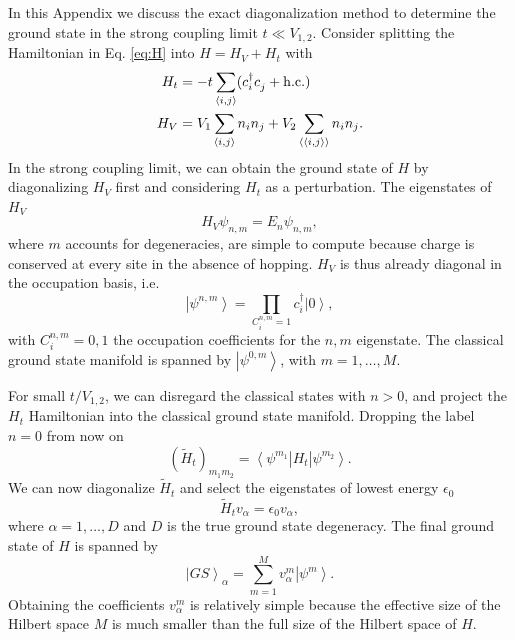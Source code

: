 \documentclass[aps,prx,10pt,twocolumn,floatfix,superscriptaddress,showpacs,numerical,footinbib]{revtex4-1}
\begin{document}
In this Appendix we discuss the exact diagonalization method to determine the ground state in the strong coupling limit $t \ll V_{1,2}$. 
%
Consider splitting the Hamiltonian in Eq. \eqref{eq:H} into $H =H_V + H_t$ with
\begin{align}
%
 H_t &=-t\sum_{\left\langle i,j\right\rangle}(c^{\dagger}_{i}c^{\vphantom{\dagger}}_{j}+ \mathrm{h.c.}) \\
H_V &= V_{1}\sum_{\left\langle i,j\right\rangle }n_{i}n_{j}+
%
V_{2}\sum_{\left\langle \left\langle i,j\right\rangle \right\rangle }n_{i}n_{j}. 
%
\label{eq:Hsplit}
\end{align}
%
In the strong coupling limit, we can obtain the ground state of $H$ by diagonalizing $H_V$ first and considering $H_t$ as a perturbation. 
%
The eigenstates of $H_V$
\begin{equation}
H_V \psi_{n,m} = E_n \psi_{n,m},
\end{equation}
where $m$ accounts for degeneracies, are simple to compute because charge is conserved at every site in the absence of hopping. 
%
$H_V$ is thus already diagonal in the occupation basis, i.e.
\begin{equation}
\left| \psi^{n,m}\right> = \prod_{C^{n,m}_i = 1} c^\dagger_i \left|0\right>,
\end{equation}
%
 with $C^{n,m}_i=0,1$ the occupation coefficients for the $n,m$ eigenstate. 
The classical ground state manifold is spanned by $\left|\psi^{0,m}\right>$, with $m=1,\dots,M$.   

For small $t/V_{1,2}$, we can disregard the classical states with $n>0$, and project the $H_t$ Hamiltonian into the classical ground state manifold. 
%
Dropping the label $n=0$ from now on
%
\begin{equation}
(\tilde{H}_t)_{m_1m_2} =  \left< \psi^{m_1} \right| H_t \left| \psi^{m_2} \right>.
\end{equation}
%
We can now diagonalize $\tilde{H}_t$ and select the eigenstates of lowest energy $\epsilon_0$
%
\begin{equation}
\tilde{H}_t v_\alpha = \epsilon_0 v_\alpha,
\end{equation}
%
where $\alpha = 1,\ldots,D$ and $D$ is the true ground state degeneracy. The final ground state of $H$ is spanned by
%
\begin{equation}
\left| GS\right>_\alpha = \sum_{m=1}^M v^m_\alpha \left| \psi^m\right>.
\end{equation}
%
Obtaining the coefficients $v^m_\alpha$ is relatively simple because the effective size of the Hilbert space $M$ is much smaller than the full size of the Hilbert space of $H$.\\
%
\end{document}
